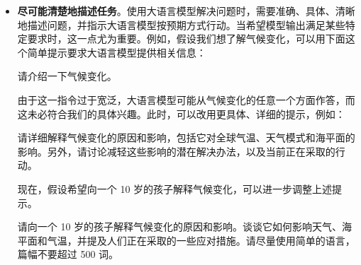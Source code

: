 \begin{itemize}
\item \vspace{0.5em} \textbf{尽可能清楚地描述任务}。使用大语言模型解决问题时，需要准确、具体、清晰地描述问题，并指示大语言模型按预期方式行动。当希望模型输出满足某些特定要求时，这一点尤为重要。例如，假设我们想了解气候变化，可以用下面这个简单提示要求大语言模型提供相关信息：

    \vspace{0.5em}
    \begin{tcolorbox}

    \hspace{2em} 请介绍一下气候变化。

    \hspace{2em} \underline{\hspace{2em}}

    \end{tcolorbox}
    \vspace{0.5em}

    由于这一指令过于宽泛，大语言模型可能从气候变化的任意一个方面作答，而这未必符合我们的具体兴趣。此时，可以改用更具体、详细的提示，例如：

    \vspace{0.5em}
    \begin{tcolorbox}

    \begingroup
    \setlength{\leftskip}{2em}
    \setlength{\rightskip}{2em}

    请详细解释气候变化的原因和影响，包括它对全球气温、天气模式和海平面的影响。另外，请讨论减轻这些影响的潜在解决办法，以及当前正在采取的行动。

    \underline{\hspace{2em}}

    \endgroup

    \end{tcolorbox}
    \vspace{0.5em}

    现在，假设希望向一个 10 岁的孩子解释气候变化，可以进一步调整上述提示。

    \vspace{0.5em}
    \begin{tcolorbox}

    \begingroup
    \setlength{\leftskip}{2em}
    \setlength{\rightskip}{2em}

    请向一个 10 岁的孩子解释气候变化的原因和影响。谈谈它如何影响天气、海平面和气温，并提及人们正在采取的一些应对措施。请尽量使用简单的语言，篇幅不要超过 500 词。


\end{tcolorbox}
\end{itemize}
